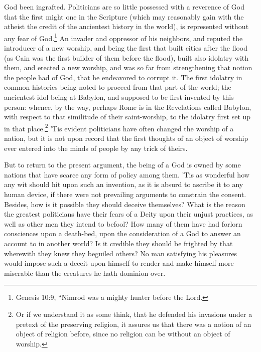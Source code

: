 \documentclass[a5paper]{book}
\begin{document}
God been ingrafted. Politicians are so little possessed with a 
reverence of God that the first might one in the Scripture (which may
reasonably gain with the atheist the credit of the ancientest history
in the world), is represented without any fear of God.\footnote{Genesis 10:9, 
    ``Nimrod was a mighty hunter before the Lord.}
An invader and oppressor of his neighbors, and reputed the introducer of a new
worship, and being the first that built cities after the flood (as Cain
was the first builder of them before the flood), built also idolatry
with them, and erected a new worship, and was so far from 
strengthening that notion the people had of God, that he endeavored to 
corrupt it. The first idolatry in common histories being noted to
proceed from that part of the world; the ancientest idol being at
Babylon, and supposed to be first invented by this person: whence,
by the way, perhaps Rome is in the Revelations called Babylon, with
respect to that similitude of their saint-worship, to the idolatry first
set up in that place.\footnote{Or if we understand it as some think, 
    that he defended his invasions under a pretext of the preserving religion,
    it assures us that there was a notion of an object of religion before, 
    since no religion can be without an object of worship.}
’Tis evident politicians have often changed the worship of a nation, 
but it is not upon record that the first thoughts of an object of worship 
ever entered into the minds of people by any trick of theirs.

But to return to the present argument, the being of a God is
owned by some nations that have scarce any form of policy among
them. 'Tis as wonderful how any wit should hit upon such an
invention, as it is absurd to ascribe it to any human device, if there
were not prevailing arguments to constrain the consent. Besides,
how is it possible they should deceive themselves? What is the
reason the greatest politicians have their fears of a Deity upon their
unjust practices, as well as other men they intend to befool? How
many of them have had forlorn consciences upon a death-bed, upon
the consideration of a God to answer an account to in another world?
Is it credible they should be frighted by that wherewith they knew
they beguiled others? No man satisfying his pleasures would 
impose such a deceit upon himself to render and make himself more %
miserable than the creatures he hath dominion over.
\end{document}
